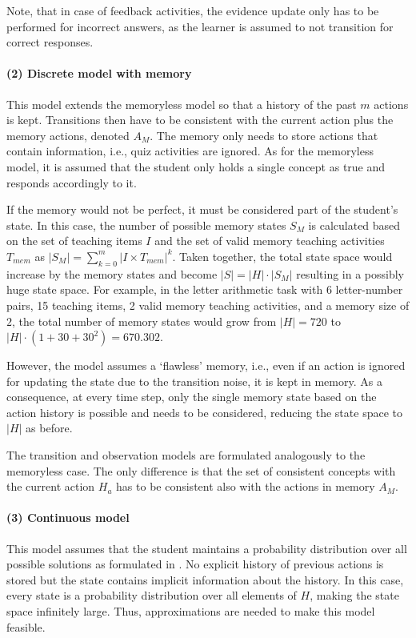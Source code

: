 Note, that in case of feedback activities, the evidence update only has to be performed for incorrect answers, as the learner is assumed to not transition for correct responses.


\paragraph{(2) Discrete model with memory}
This model extends the memoryless model so that a history of the past $m$ actions is kept.
Transitions then have to be consistent with the current action plus the memory actions, denoted $A_M$.
The memory only needs to store actions that contain information, i.e., quiz activities are ignored.
As for the memoryless model, it is assumed that the student only holds a single concept as true and responds accordingly to it.


If the memory would not be perfect, it must be considered part of the student's state.
In this case, the number of possible memory states $S_M$ is calculated based on the set of teaching items $I$ and the set of valid memory teaching activities $T_{mem}$ as $|S_M| = \sum_{k=0}^m |I \times T_{mem}|^k$.
Taken together, the total state space would increase by the memory states and become $|S|=|H| \cdot |S_M|$ resulting in a possibly huge state space.
For example, in the letter arithmetic task with 6 letter-number pairs, 15 teaching items, 2 valid memory teaching activities, and a memory size of $2$, the total number of memory states would grow from $|H|=720$ to $|H|\cdot (1 + 30 + 30^2) =670.302$.


However, the model assumes a `flawless' memory, i.e., even if an action is ignored for updating the state due to the transition noise, it is kept in memory. As a consequence, at every time step, only the single memory state based on the action history is possible and needs to be considered, reducing the state space to $|H|$ as before.

The transition and observation models are formulated analogously to the memoryless case. 
The only difference is that the set of consistent concepts with the current action $H_a$ has to be consistent also with the actions in memory $A_M$.

\paragraph{(3) Continuous model}
This model assumes that the student maintains a probability distribution over all possible solutions as formulated in \cite{tenenbaum2000rules}. 
No explicit history of previous actions is stored but the state contains implicit information about the history.
In this case, every state is a probability distribution over all elements of $H$, making the state space infinitely large. Thus, approximations are needed to make this model feasible.

